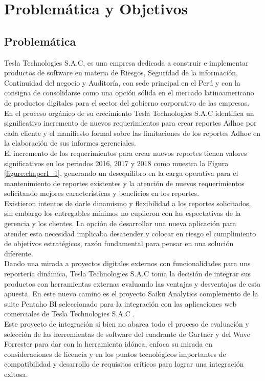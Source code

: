 \chapter{Problemática y Objetivos} \label{chapter:I}
\section{Problem\'{a}tica}
\begin{spacing}{1.5}	
	Tesla Technologies S.A.C, es una empresa dedicada a construir e implementar productos de software en materia de Riesgos, Seguridad de la información, Continuidad del negocio y Auditoría, con sede principal en el Perú y con la consigna de consolidarse como una opci\'{o}n s\'{o}lida en el mercado latinoamericano de productos digitales para el sector del gobierno corporativo de las empresas.\\	                         
	En el proceso org\'{a}nico de su crecimiento Tesla Technologies S.A.C  identifica un significativo incremento de nuevos requerimientos para crear reportes Adhoc por cada cliente y el manifiesto formal sobre las limitaciones de los reportes Adhoc en la elaboraci\'{o}n de sus informes gerenciales.\\
	El incremento de los requerimientos para crear nuevos reportes tienen valores significativos en los periodos 2016, 2017 y 2018 como muestra la Figura \ref{figure:chaperI_1}, generando un desequilibro en la carga operativa para el mantenimiento de reportes existentes y la atenci\'{o}n de nuevos requerimientos solicitando mejores caracter\'{i}sticas y beneficios en los reportes.\\
	Existieron intentos de darle dinamismo y flexibilidad a los reportes solicitados, sin embargo los entregables m\'{i}nimos no cuplieron con las espectativas de la gerencia y los clientes. La opci\'{o}n de desarrollar una nueva aplicaci\'{o}n para atender esta necesidad implicaba desatender y colocar en riesgo el cumplimiento de objetivos estrat\'{e}gicos, raz\'{o}n fundamental para pensar en una soluci\'{o}n diferente.\\
	Dando una mirada a proyectos digitales externos con funcionalidades para uns reporter\'{i}a din\'{a}mica, Tesla Technologies S.A.C toma la decisi\'{o}n de integrar sus productos con herramientas externas evaluando las ventajas y desventajas de esta apuesta. En este nuevo camino es el proyecto Saiku Analytics complemento de la suite Pentaho BI seleccionado para la integración con las aplicaciones web comerciales de Tesla Technologies S.A.C .\\	
	Este proyecto de integraci\'{o}n si bien no abarca todo el proceso de evaluaci\'{o}n y selecci\'{o}n de  las herremientas de software del cuadrante de Gartner y del Wave Forrester para dar con la herramienta id\'{o}nea, enfoca su mirada en consideraciones de licencia y en los puntos tecnol\'{o}gicos importantes de compatibilidad y desarrollo de requisitos cr\'{i}ticos para lograr una integraci\'{o}n exitosa.\\
	

\end{spacing}
